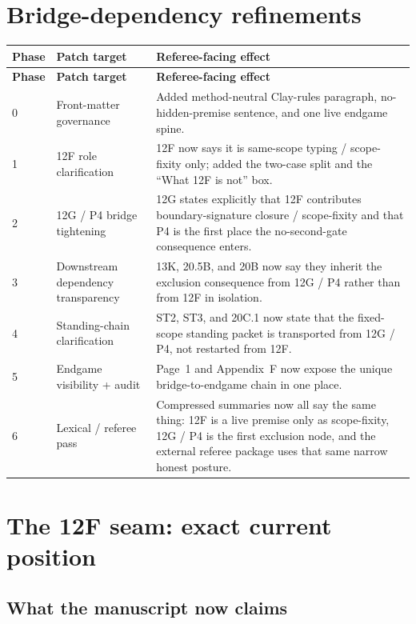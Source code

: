 \documentclass[11pt,letterpaper]{article}
\begin{document}
\section{Bridge-dependency refinements}

\begin{longtable}{L{0.75in}L{2.05in}L{3.45in}}
\toprule
\textbf{Phase} & \textbf{Patch target} & \textbf{Referee-facing effect}\\
\midrule
\endfirsthead
\toprule
\textbf{Phase} & \textbf{Patch target} & \textbf{Referee-facing effect}\\
\midrule
{} & Front-matter governance & Added method-neutral Clay-rules paragraph, no-hidden-premise sentence, and one live endgame spine.\\
1 & 12F role clarification & 12F now says it is same-scope typing / scope-fixity only; added the two-case split and the ``What 12F is not'' box.\\
2 & 12G / P4 bridge tightening & 12G states explicitly that 12F contributes boundary-signature closure / scope-fixity and that P4 is the first place the no-second-gate consequence enters.\\
3 & Downstream dependency transparency & 13K, 20.5B, and 20B now say they inherit the exclusion consequence from 12G / P4 rather than from 12F in isolation.\\
4 & Standing-chain clarification & ST2, ST3, and 20C.1 now state that the fixed-scope standing packet is transported from 12G / P4, not restarted from 12F.\\
5 & Endgame visibility + audit & Page~1 and Appendix~F now expose the unique bridge-to-endgame chain in one place.\\
6 & Lexical / referee pass & Compressed summaries now all say the same thing: 12F is a live premise only as scope-fixity, 12G / P4 is the first exclusion node, and the external referee package uses that same narrow honest posture.\\
\bottomrule
\end{longtable}

\section{The 12F seam: exact current position}

\subsection{What the manuscript now claims}
\end{document}
